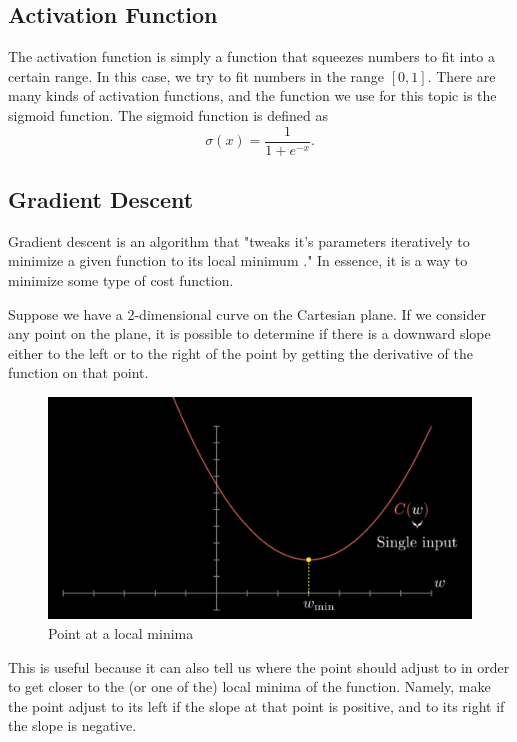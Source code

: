 \documentclass[a4paper, 11pt, english]{article}
\begin{document}
\subsection{Activation Function}
\par The activation function is simply a function that squeezes numbers to fit into a certain range. In this case, we try to fit numbers in the range $[0,1]$. There are many kinds of activation functions, and the function we use for this topic is the sigmoid function. The sigmoid function is defined as
\[\sigma(x) = \frac{1}{1+e^{-x}}.\]

\subsection{Gradient Descent}
\par Gradient descent is an algorithm that "tweaks it's parameters iteratively to minimize a given function to its local minimum \cite{donges_2018}." In essence, it is a way to minimize some type of cost function.
\par Suppose we have a 2-dimensional curve on the Cartesian plane. If we consider any point on the plane, it is possible to determine if there is a downward slope either to the left or to the right of the point by getting the derivative of the function on that point.

\begin{figure}[H]
  \centering
  \includegraphics[width=12cm]{images/gd1.jpg}
  \caption{Point at a local minima\cite{3blue1brown_2017_2}}
  \label{fig:gd1}
\end{figure}

\par This is useful because it can also tell us where the point should adjust to in order to get closer to the (or one of the) local minima of the function. Namely, make the point adjust to its left if the slope at that point is positive, and to its right if the slope is negative.
\end{document}
